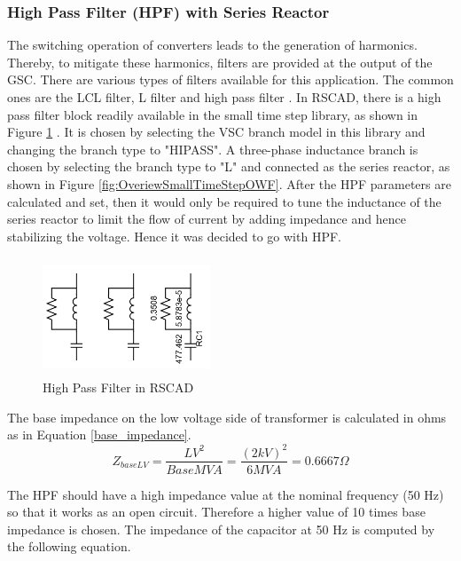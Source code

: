 \subsubsection{High Pass Filter (HPF) with Series Reactor}\label{HPF_design}
The switching operation of converters leads to the generation of harmonics. Thereby, to mitigate these harmonics, filters are provided at the output of the \gls{GSC}. There are various types of filters available for this application. The common ones are the LCL filter, L filter and high pass filter \cite{beres_review_2016}. In RSCAD, there is a high pass filter block readily available in the small time step library, as shown in Figure \ref{fig:HPF} \cite{rtds_tech}. It is chosen by selecting the \gls{VSC} branch model in this library and changing the branch type to "HIPASS". A three-phase inductance branch is chosen by selecting the branch type to "L" and connected as the series reactor, as shown in Figure \ref{fig:OveriewSmallTimeStepOWF}. After the \gls{HPF} parameters are calculated and set, then it would only be required to tune the inductance of the series reactor to limit the flow of current by adding impedance and hence stabilizing the voltage. Hence it was decided to go with \gls{HPF}.

\begin{figure}[H]
\centering
    \includegraphics[height = 3.5cm,width = 5cm]{Diagrams/Chapter_3/HPF_RSCAD.PNG}
    \caption{High Pass Filter in RSCAD}
    \label{fig:HPF}
\end{figure}

The base impedance on the low voltage side of transformer is calculated in ohms as in Equation \ref{base_impedance}.
\begin{equation}\label{base_impedance}
    Z_{baseLV} = \frac{LV^2}{Base MVA} = \frac{(2 kV)^2}{6 MVA} = 0.6667\Omega  
\end{equation}

The \gls{HPF} should have a high impedance value at the nominal frequency (50 Hz) so that it works as an open circuit. Therefore a higher value of 10 times base impedance is chosen. The impedance of the capacitor at 50 Hz is computed by the following equation.

